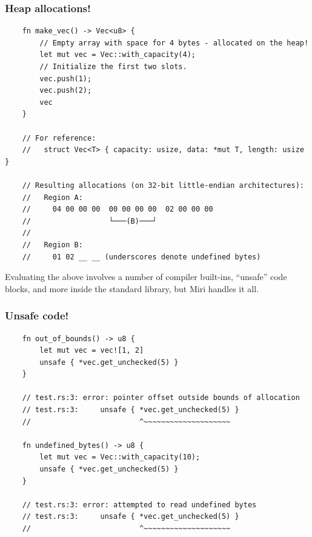 \documentclass{beamer}
\begin{document}
\begin{frame}[fragile]
  \frametitle{Heap allocations!}
  \begin{verbatim}
    fn make_vec() -> Vec<u8> {
        // Empty array with space for 4 bytes - allocated on the heap!
        let mut vec = Vec::with_capacity(4);
        // Initialize the first two slots.
        vec.push(1);
        vec.push(2);
        vec
    }

    // For reference:
    //   struct Vec<T> { capacity: usize, data: *mut T, length: usize }

    // Resulting allocations (on 32-bit little-endian architectures):
    //   Region A:
    //     04 00 00 00  00 00 00 00  02 00 00 00
    //                  └───(B)───┘
    //
    //   Region B:
    //     01 02 __ __ (underscores denote undefined bytes)
  \end{verbatim}

  \footnotesize{Evaluating the above involves a number of compiler built-ins,
  ``unsafe'' code blocks, and more inside the standard library,
  but Miri handles it all.}
\end{frame}

\begin{frame}[fragile]
  \frametitle{Unsafe code!}
  \begin{verbatim}
    fn out_of_bounds() -> u8 {
        let mut vec = vec![1, 2]
        unsafe { *vec.get_unchecked(5) }
    }

    // test.rs:3: error: pointer offset outside bounds of allocation
    // test.rs:3:     unsafe { *vec.get_unchecked(5) }
    //                         ^~~~~~~~~~~~~~~~~~~~~

    fn undefined_bytes() -> u8 {
        let mut vec = Vec::with_capacity(10);
        unsafe { *vec.get_unchecked(5) }
    }

    // test.rs:3: error: attempted to read undefined bytes
    // test.rs:3:     unsafe { *vec.get_unchecked(5) }
    //                         ^~~~~~~~~~~~~~~~~~~~~
  \end{verbatim}
\end{frame}
\end{document}

